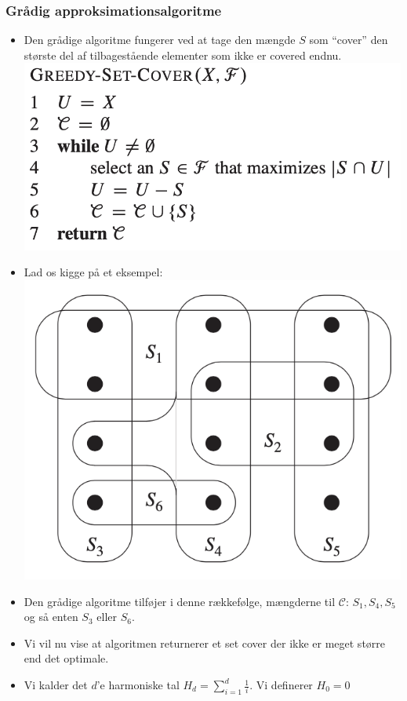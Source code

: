 \begin{frame}[allowframebreaks]
  \frametitle{Grådig approksimationsalgoritme}
  \begin{itemize}
	\item Den grådige algoritme fungerer ved at tage den mængde $S$ som ``cover'' den største del af tilbagestående elementer som ikke er covered endnu.
	\includegraphics[scale=0.5]{figur/greedy-set-cover.png}
	\item Lad os kigge på et eksempel:
	\includegraphics[scale=0.5]{figur/figur3503.png}
	\item Den grådige algoritme tilføjer i denne rækkefølge, mængderne til $\mathcal{C}$: $S_{1}, S_{4}, S_{5}$ og så enten $S_{3}$ eller $S_{6}$.
	\item Vi vil nu vise at algoritmen returnerer et set cover der ikke er meget større end det optimale.
	\item Vi kalder det $d$'e harmoniske tal $H_{d} = \sum_{i=1}^d \frac{1}{i}$. Vi definerer $H_{0} = 0$

\end{itemize}
\end{frame}
